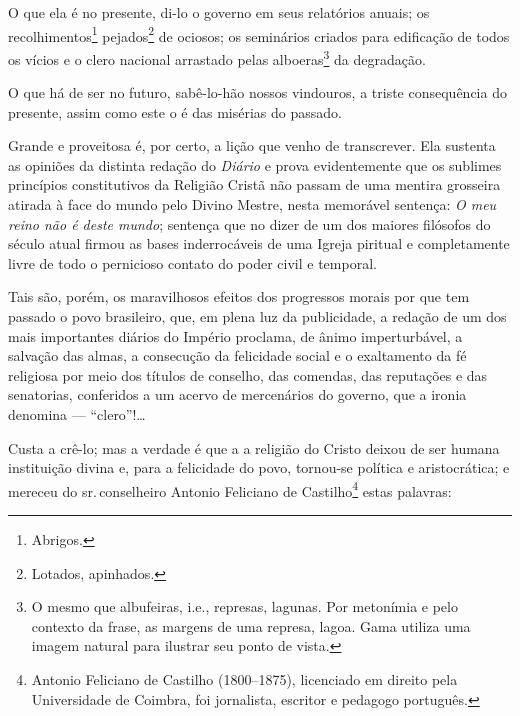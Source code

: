O que ela é no presente, di-lo o governo em seus relatórios anuais; os
recolhimentos\footnote{Abrigos.} pejados\footnote{Lotados,
  apinhados.} de ociosos; os seminários criados para edificação de todos
os vícios e o clero nacional arrastado pelas alboeras\footnote{O mesmo
  que albufeiras, i.e., represas, lagunas. Por metonímia e pelo contexto
  da frase, as margens de uma represa, lagoa. Gama utiliza uma imagem
  natural para ilustrar seu ponto de vista.} da degradação.

O que há de ser no futuro, sabê-lo-hão nossos vindouros, a triste
consequência do presente, assim como este o é das misérias do passado.

Grande e proveitosa é, por certo, a lição que venho de transcrever. Ela
sustenta as opiniões da distinta redação do \emph{Diário} e prova
evidentemente que os sublimes princípios constitutivos da Religião
Cristã não passam de uma mentira grosseira atirada à face do mundo pelo
Divino Mestre, nesta memorável sentença: \emph{O meu reino não é deste
mundo}; sentença que no dizer de um dos maiores filósofos do século
atual firmou as bases inderrocáveis de uma Igreja piritual e %
completamente livre de todo o pernicioso contato do poder civil e
temporal.

Tais são, porém, os maravilhosos efeitos dos progressos morais por que
tem passado o povo brasileiro, que, em plena luz da publicidade, a
redação de um dos mais importantes diários do Império proclama, de ânimo
imperturbável, a salvação das almas, a consecução da felicidade social e
o exaltamento da fé religiosa por meio dos títulos de conselho, das
comendas, das reputações e das senatorias, conferidos a um acervo de
mercenários do governo, que a ironia denomina --- ``clero''!\ldots{}

Custa a crê-lo; mas a verdade é que a a religião do Cristo deixou de ser
humana instituição divina e, para a felicidade do povo, tornou-se
política e aristocrática; e mereceu do sr.\,conselheiro Antonio Feliciano
de Castilho\footnote{Antonio Feliciano de Castilho (1800--1875),
  licenciado em direito pela Universidade de Coimbra, foi jornalista,
  escritor e pedagogo português.} estas palavras:

